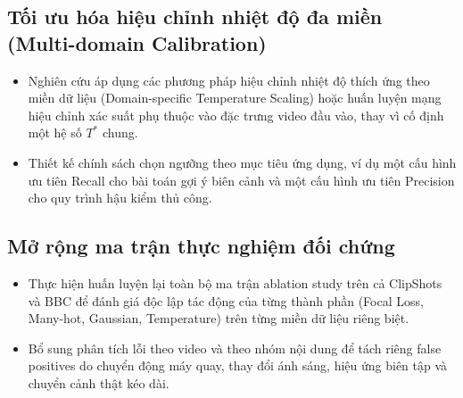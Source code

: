 \subsection{Tối ưu hóa hiệu chỉnh nhiệt độ đa miền (Multi-domain Calibration)}
\begin{itemize}
    \item Nghiên cứu áp dụng các phương pháp hiệu chỉnh nhiệt độ thích ứng theo miền dữ liệu (Domain-specific Temperature Scaling) hoặc huấn luyện mạng hiệu chỉnh xác suất phụ thuộc vào đặc trưng video đầu vào, thay vì cố định một hệ số $T^*$ chung.
    \item Thiết kế chính sách chọn ngưỡng theo mục tiêu ứng dụng, ví dụ một cấu hình ưu tiên Recall cho bài toán gợi ý biên cảnh và một cấu hình ưu tiên Precision cho quy trình hậu kiểm thủ công.
\end{itemize}

\subsection{Mở rộng ma trận thực nghiệm đối chứng}
\begin{itemize}
    \item Thực hiện huấn luyện lại toàn bộ ma trận ablation study trên cả ClipShots và BBC để đánh giá độc lập tác động của từng thành phần (Focal Loss, Many-hot, Gaussian, Temperature) trên từng miền dữ liệu riêng biệt.
    \item Bổ sung phân tích lỗi theo video và theo nhóm nội dung để tách riêng false positives do chuyển động máy quay, thay đổi ánh sáng, hiệu ứng biên tập và chuyển cảnh thật kéo dài.
\end{itemize}
